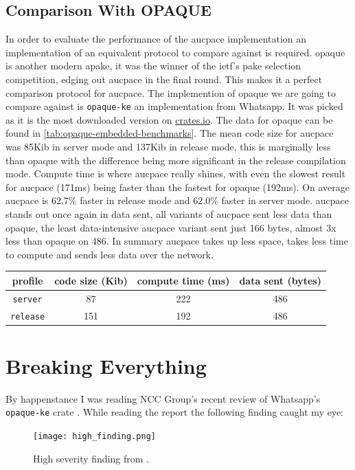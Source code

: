 \subsection{Comparison With OPAQUE}
In order to evaluate the performance of the \gls{aucpace} implementation an implementation of an equivalent protocol to compare against is required.
\gls{opaque} is another modern \gls{apake}, it was the winner of the \gls{ietf}'s \gls{pake} selection competition, edging out \gls{aucpace} in the final round.
This makes it a perfect comparison protocol for \gls{aucpace}.
The implemention of \gls{opaque} we are going to compare against is \texttt{opaque-ke} an implementation from Whatsapp.
It was picked as it is the most downloaded version on \href{https://crates.io/}{crates.io}.
The data for \gls{opaque} can be found in \cref{tab:opaque-embedded-benchmarks}.
The mean code size for \gls{aucpace} was 85Kib in server mode and 137Kib in release mode, this is marginally less than \gls{opaque} with the difference being more significant in the release compilation mode.
Compute time is where \gls{aucpace} really shines, with even the slowest result for \gls{aucpace} (171ms) being faster than the fastest for \gls{opaque} (192ms).
On average \gls{aucpace} is $62.7\%$ faster in release mode and $62.0\%$ faster in server mode.
\gls{aucpace} stands out once again in data sent, all variants of \gls{aucpace} sent less data than \gls{opaque}, the least data-intensive \gls{aucpace} variant sent just 166 bytes, almost 3x less than \gls{opaque} on 486.
In summary \gls{aucpace} takes up less space, takes less time to compute and sends less data over the network.

\clearpage

\begin{center}
  \label{tab:opaque-embedded-benchmarks}
  \begin{tabular}{ cccc }
    \toprule
    profile & code size (Kib) & compute time (ms) & data sent (bytes) \\
    \midrule
    \texttt{server}  & 87 & 222 & 486 \\
    \texttt{release} & 151 & 192 & 486 \\
    \bottomrule
  \end{tabular}
\end{center}

\section{Breaking Everything}
By happenstance I was reading NCC Group's recent review of Whatsapp's \texttt{opaque-ke} crate \cite{whatsapp-are-dumb-too, whatsapp-are-dumb-too-report}.
While reading the report the following finding caught my eye:
\begin{figure}[H]
  \centering

  \texttt{[image: high\_finding.png]}
  \caption{High severity finding from \cite{whatsapp-are-dumb-too-report}.}
  \label{fig:high-severity-finding}
\end{figure}


